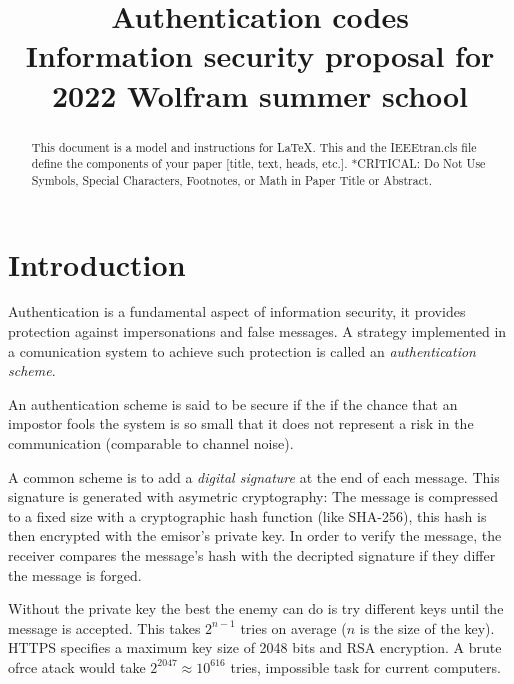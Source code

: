 \documentclass[conference]{IEEEtran}
\begin{document}
\title{
Authentication codes  \\
{\footnotesize Information security proposal for 2022 Wolfram summer school}
}

\author{
}

\maketitle

\begin{abstract}
    This document is a model and instructions for \LaTeX.
    This and the IEEEtran.cls file define the components of your paper [title, text, heads, etc.]. *CRITICAL: Do Not Use Symbols, Special Characters, Footnotes,
    or Math in Paper Title or Abstract.
\end{abstract}


%
%
\section{Introduction}
Authentication is a fundamental aspect of information security, it provides protection against impersonations and false messages. A strategy implemented in a comunication system to achieve such protection is called an \textit{authentication scheme}.

An authentication scheme is said to be secure if the if the chance that an impostor fools the system is so small that it does not represent a risk in the communication (comparable to channel noise).

A common scheme is to add a \textit{digital signature} at the end of each message. This signature is generated with asymetric cryptography: The message is compressed to a fixed size with a cryptographic hash function (like SHA-256), this hash is then encrypted with the emisor's private key. In order to verify the message, the receiver compares the message's hash with the decripted signature if they differ the message is forged.

Without the private key the best the enemy can do is try different keys until the message is accepted. This takes $2^{n-1}$ tries on average ($n$ is the size of the key). HTTPS specifies a maximum key size of 2048 bits and RSA encryption. A brute ofrce atack would take $2^{2047} \approx 10^{616}$ tries, impossible task for current computers.
\end{document}
